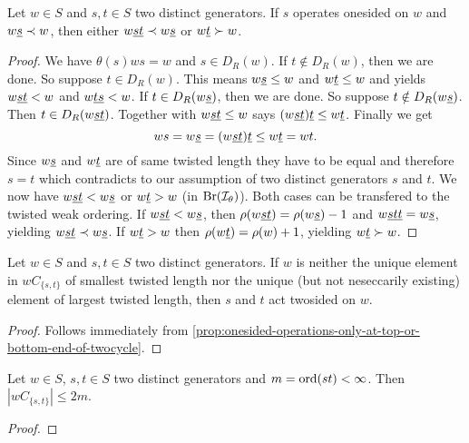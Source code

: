 \begin{prop}
	Let $w \in S$ and $s,t \in S$ two distinct generators. If $s$ operates onesided on $w$ and $w \underline{s} \prec w$, then either $w \underline{st} \prec w \underline{s}$ or $w \underline{t} \succ w$.

	\begin{proof}
		We have $\theta(s)ws = w$ and $s \in D_R(w)$. If $t \notin D_R(w)$, then we are done. So suppose $t \in D_R(w)$. This means $w \underline{s} \leq w$ and $w \underline{t} \leq w$ and \cite[Lemma 3.9]{hultman:comb-twisted-invo} yields $w \underline{st} < w$ and $w \underline{ts} < w$. If $t \in D_R(w \underline{s})$, then we are done. So suppose $t \notin D_R(w \underline{s})$. Then $t \in D_R(w \underline{st})$. Together with $w \underline{st} \leq w$ \cite[Lemma 3.9(2)]{hultman:comb-twisted-invo} says $(w \underline{st}) \underline{t} \leq w \underline{t}$. Finally we get
		$$ ws = w \underline{s} = (w \underline{st}) \underline{t} \leq w \underline{t} = wt.$$
		Since $w \underline{s}$ and $w \underline{t}$ are of same twisted length they have to be equal and therefore $s = t$ which contradicts to our assumption of two distinct generators $s$ and $t$. We now have $w \underline{s} \underline{t} < w \underline{s}$ or $w \underline{t} > w$ (in $\operatorname{Br}(\mathcal{I}_{\theta})$). Both cases can be transfered to the twisted weak ordering. If $w \underline{s} \underline{t} < w \underline{s}$, then $\rho(w \underline{s} \underline{t}) = \rho(w \underline{s}) - 1$ and $w \underline{s} \underline{t} \underline{t} = w \underline{s}$, yielding $w \underline{s} \underline{t} \prec w \underline{s}$. If $w \underline{t} > w$ then $\rho(w \underline{t}) = \rho(w) + 1$, yielding $w \underline{t} \succ w$.
	\end{proof}
\end{prop}

\begin{coro}
	\todo
	Let $w \in S$ and $s,t \in S$ two distinct generators. If $w$ is neither the unique element in $wC_{\{s,t\}}$ of smallest twisted length nor the unique (but not neseccarily existing) element of largest twisted length, then $s$ and $t$ act twosided on $w$.

	\begin{proof}
		Follows immediately from \ref{prop:onesided-operations-only-at-top-or-bottom-end-of-twocycle}.
	\end{proof}
\end{coro}

\begin{lemm}
	Let $w \in S$, $s,t \in S$ two distinct generators and $m = \operatorname{ord}(st) < \infty$. Then $|wC_{\{s,t\}}| \leq 2m$.

	\begin{proof}
		\todo
	\end{proof}
\end{lemm}

